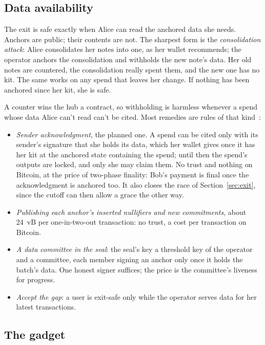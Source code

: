 \documentclass[11pt]{article}
\begin{document}
\subsection{Data availability}
\label{sec:da}

The exit is safe exactly when Alice can read the anchored data she
needs. Anchors are public; their contents are not. The sharpest form is
the \emph{consolidation attack}: Alice consolidates her notes into one,
as her wallet recommends; the operator anchors the consolidation and
withholds the new note's data. Her old notes are countered, the
consolidation really spent them, and the new one has no kit. The same
works on any spend that leaves her change. If nothing has been anchored
since her kit, she is safe.

A counter wins the hub a contract, so withholding is harmless whenever a
spend whose data Alice can't read can't be cited. Most remedies are
rules of that kind~\cite{bitcoinrollups}:
\begin{itemize}[leftmargin=1.5em]
\item \emph{Sender acknowledgment}, the planned one. A spend can be cited
  only with its sender's signature that she holds its data, which her
  wallet gives once it has her kit at the anchored state containing the
  spend; until then the spend's outputs are locked, and only she may
  claim them. No trust and nothing on Bitcoin, at the price of
  two-phase finality: Bob's payment is final once the acknowledgment is
  anchored too. It also closes the race of Section~\ref{sec:exit}, since
  the cutoff can then allow a grace the other way.
\item \emph{Publishing each anchor's inserted nullifiers and new
  commitments}, about 24~vB per one-in-two-out transaction: no trust,
  a cost per transaction on Bitcoin.
\item \emph{A data committee in the seal}: the seal's key a threshold key
  of the operator and a committee, each member signing an anchor only
  once it holds the batch's data. One honest signer suffices; the price
  is the committee's liveness for progress.
\item \emph{Accept the gap}: a user is exit-safe only while the operator
  serves data for her latest transactions.
\end{itemize}

\subsection{The gadget}
\end{document}
